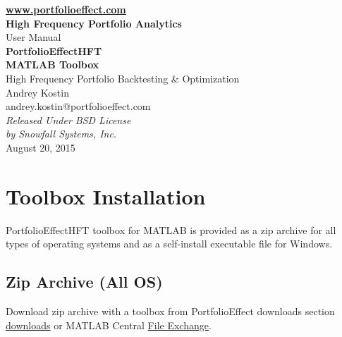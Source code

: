 \documentclass[letterpaper]{report}
\begin{document}
\begin{titlepage}
\begin{center}
\vspace{5cm}
{\bfseries\href{https://www.portfolioeffect.com}{www.portfolioeffect.com} \\
High Frequency Portfolio Analytics\\}
\vspace{8cm}
{\huge User Manual \\}
\vspace{0.3cm}
{\Huge\bfseries PortfolioEffectHFT \\ MATLAB Toolbox \\}
\vspace{0.4cm}
{\Large High Frequency Portfolio Backtesting \& Optimization \\}
\vspace{1.5cm}
{Andrey Kostin \\ andrey.kostin@portfolioeffect.com} \\[14pt]
\vfill
\emph{{Released Under BSD License\\ by Snowfall Systems,
Inc.}}\\[2cm]
{August 20, 2015}
\end{center}
\end{titlepage}

\cleardoublepage
{}
{}
\renewcommand{\bibname}{Contents}
\tableofcontents 

\chapter{Toolbox Installation}
PortfolioEffectHFT toolbox for MATLAB is provided as a zip archive for all
types of operating systems and as a self-install executable file for Windows. 

\section{Zip Archive (All OS)}
Download zip archive with a toolbox from PortfolioEffect downloads section 
\href{https://www.portfolioeffect.com/docs/platform/quant/downloads}{downloads}
or MATLAB Central 
\href{http://www.mathworks.com/matlabcentral/fileexchange}{File Exchange}.
\end{document}
